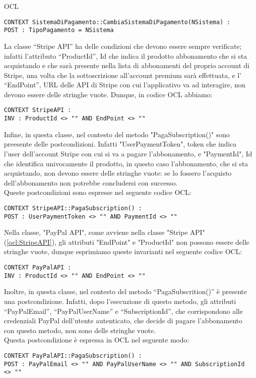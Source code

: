 \begin{listaPersonale}{OCL}
\begin{lstlisting}
CONTEXT SistemaDiPagamento::CambiaSistemaDiPagamento(NSistema) :
POST : TipoPagamento = NSistema
    \end{lstlisting}




    La classe “Stripe API” ha delle condizioni che devono essere sempre verificate; infatti l’attributo “ProductId”, Id che indica il prodotto abbonamento che si sta acquistando e che sarà presente nella lista di abbonamenti del proprio account di Stripe, una volta che la sottoscrizione all’account premium sarà effettuata, e l’ “EndPoint”, URL delle API di Stripe con cui l’applicativo va ad interagire, non devono essere delle stringhe vuote.
    Dunque, in codice OCL abbiamo:
    \begin{lstlisting}
CONTEXT StripeAPI :
INV : ProductId <> "" AND EndPoint <> ""
    \end{lstlisting}
    Infine, in questa classe, nel contesto del metodo "PagaSubscription()" sono preesente delle postcondizioni. Infatti "UserPaymentToken", token che indica l'user dell'account Stripe con cui si va a pagare l'abbonamento, e "PaymentId", Id che identifica univocamente il prodotto, in questo caso l'abbonamento, che si sta acquistando, non devono essere delle stringhe vuote: se lo fossero l'acquisto dell'abbonamento non potrebbe concludersi con successo.\\
    Queste postcondizioni sono espresse nel seguente codice OCL:
    \begin{lstlisting}
CONTEXT StripeAPI::PagaSubscription() :
POST : UserPaymentToken <> "" AND PaymentId <> ""
    \end{lstlisting}




    Nella classe, "PayPal API", come avviene nella classe "Stripe API" (\ref{ocl:StripeAPI}), gli attributi "EndPoint" e "ProductId" non possono essere delle stringhe vuote, dunque esprimiamo queste invarianti nel seguente codice OCL:
    \begin{lstlisting}
CONTEXT PayPalAPI :
INV : ProductId <> "" AND EndPoint <> ""
    \end{lstlisting}
    Inoltre, in questa classe, nel contesto del metodo “PagaSubscrition()” è presente una postcondizione. Infatti, dopo l’esecuzione di questo metodo, gli attributi “PayPalEmail”, “PayPalUserName” e “SubscriptionId”, che corrispondono alle credenziali PayPal dell’utente autenticato, che decide di pagare l’abbonamento con questo metodo, non sono delle stringhe vuote. \\
    Questa postcondizione è espressa in OCL nel seguente modo:
    \begin{lstlisting}
CONTEXT PayPalAPI::PagaSubscription() :
POST : PayPalEmail <> "" AND PayPalUserName <> "" AND SubscriptionId <> ""
    \end{lstlisting}





\end{listaPersonale}
